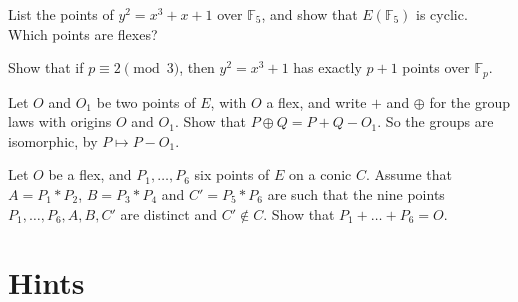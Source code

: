 \begin{exercise}[$\star$]\label{geometry:ex:countfive}
List the points of $y^2=x^3+x+1$ over $\mathbb F_5$, and show that $E(\mathbb F_5)$ is cyclic. Which points are flexes?
\end{exercise}

\begin{exercise}[$\star\star$]\label{geometry:ex:xcubeplusone}
Show that if $p\equiv2\pmod3$, then $y^2=x^3+1$ has exactly $p+1$ points over $\mathbb F_p$.
\end{exercise}

\begin{exercise}[$\star\star$]\label{geometry:ex:changeorigin}
Let $O$ and $O_1$ be two points of $E$, with $O$ a flex, and write $+$ and $\oplus$ for the group laws with origins $O$ and $O_1$. Show that
$P\oplus Q=P+Q-O_1$. So the groups are isomorphic, by $P\mapsto P-O_1$.
\end{exercise}

\begin{exercise}[$\star\star\star$]\label{geometry:ex:sixonconic}
Let $O$ be a flex, and $P_1,\dots,P_6$ six points of $E$ on a conic $C$. Assume that $A=P_1*P_2$, $B=P_3*P_4$ and $C'=P_5*P_6$ are such that the nine points $P_1,\dots,P_6,A,B,C'$ are distinct and $C'\notin C$. Show that $P_1+\dots+P_6=O$.
\end{exercise}

\section{Hints}


